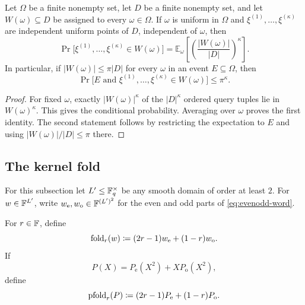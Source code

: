 \begin{lemma}
\label{lem:independent-uniform-queries}
Let $\Omega$ be a finite nonempty set, let $D$ be a finite nonempty set, and let $W(\omega)\subseteq D$ be assigned to every $\omega\in\Omega$.  If $\omega$ is uniform in $\Omega$ and $\xi^{(1)},\ldots,\xi^{(\kappa)}$ are independent uniform points of $D$, independent of $\omega$, then
\[
  \Pr\bigl[\xi^{(1)},\ldots,\xi^{(\kappa)}\in W(\omega)\bigr]
  =
  \mathbb E_{\omega}\left[
    \left(\frac{|W(\omega)|}{|D|}\right)^{\kappa}
  \right].
\]
In particular, if $|W(\omega)|\le\pi|D|$ for every $\omega$ in an event $E\subseteq\Omega$, then
\[
  \Pr\bigl[E\text{ and }\xi^{(1)},\ldots,\xi^{(\kappa)}\in W(\omega)\bigr]
  \le \pi^{\kappa}.
\]
\end{lemma}

\begin{proof}
For fixed $\omega$, exactly $|W(\omega)|^{\kappa}$ of the $|D|^{\kappa}$ ordered query tuples lie in $W(\omega)^{\kappa}$.  This gives the conditional probability.  Averaging over $\omega$ proves the first identity.  The second statement follows by restricting the expectation to $E$ and using $|W(\omega)|/|D|\le\pi$ there.
\end{proof}

\subsection{The kernel fold}
\label{sec:generic-kernel-fold}

For this subsection let $L'\le\mathbb{F}_q^\times$ be any smooth domain of order at least $2$.  For $w\in\mathbb{F}^{L'}$, write $w_{\mathrm e},w_{\mathrm o}\in\mathbb{F}^{(L')^2}$ for the even and odd parts of \cref{eq:evenodd-word}.

\begin{definition}
\label{def:kernel-fold}
For $r\in\mathbb{F}$, define
\begin{equation}
  \operatorname{fold}_r(w)
  \coloneqq
  (2r-1)w_{\mathrm e}+(1-r)w_{\mathrm o}.
  \label{eq:kernel-word-fold}
\end{equation}
If
\[
  P(X)=P_{\mathrm e}(X^2)+XP_{\mathrm o}(X^2),
\]
define
\begin{equation}
  \operatorname{pfold}_r(P)
  \coloneqq
  (2r-1)P_{\mathrm e}+(1-r)P_{\mathrm o}.
  \label{eq:kernel-poly-fold}
\end{equation}
\end{definition}

